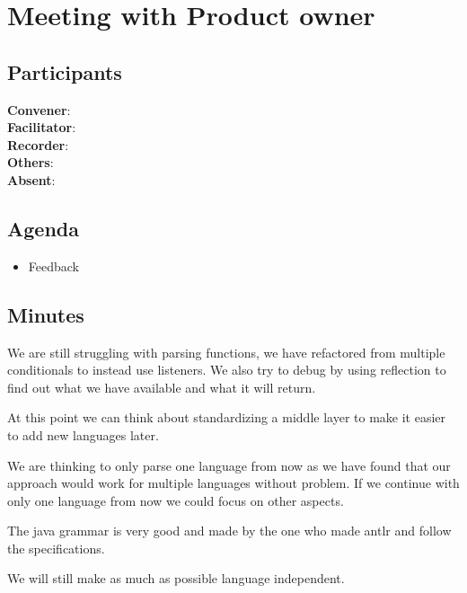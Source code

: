 \section*{Meeting with Product owner}

\subsection*{Participants}
\textbf{Convener}: \productowner{}\\
\textbf{Facilitator}: \facilitator{}  \\
\textbf{Recorder}: \scrummaster{}  \\
\textbf{Others}: \groupleader{} \\
\textbf{Absent}: 

\subsection*{Agenda}
\begin{itemize}
    \item Feedback
\end{itemize}

\subsection*{Minutes}
We are still struggling with parsing functions, we have refactored from multiple conditionals to instead use listeners. We also try to debug by using reflection to find out what we have available and what it will return. 

At this point we can think about standardizing a middle layer to make it easier to add new languages later.

We are thinking to only parse one language from now as we have found that our approach would work for multiple languages without problem. If we continue with only one language from now we could focus on other aspects. 

The java grammar is very good and made by the one who made antlr and follow the specifications. 

We will still make as much as possible language independent. 
\newpage